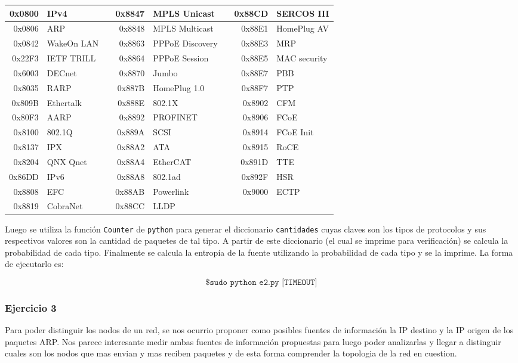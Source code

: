 \begin{tabular}{|r|l|c|r|l|c|r|l|}
\hline
0x0800 & IPv4 & & 0x8847 & MPLS Unicast & & 0x88CD & SERCOS III \\
\hline
0x0806 & ARP & & 0x8848 & MPLS Multicast & & 0x88E1 & HomePlug AV \\
\hline
0x0842 & WakeOn LAN & & 0x8863 & PPPoE Discovery & & 0x88E3 & MRP \\
\hline
0x22F3 & IETF TRILL & & 0x8864 & PPPoE Session & & 0x88E5 & MAC security \\
\hline
0x6003 & DECnet & & 0x8870 & Jumbo & & 0x88E7 & PBB \\
\hline
0x8035 & RARP & & 0x887B & HomePlug 1.0 & & 0x88F7 & PTP \\
\hline
0x809B & Ethertalk & & 0x888E & 802.1X & & 0x8902 & CFM \\
\hline
0x80F3 & AARP & & 0x8892 & PROFINET & & 0x8906 & FCoE \\
\hline
0x8100 & 802.1Q & & 0x889A & SCSI & & 0x8914 & FCoE Init \\
\hline
0x8137 & IPX & & 0x88A2 & ATA & & 0x8915 & RoCE \\
\hline
0x8204 & QNX Qnet & & 0x88A4 & EtherCAT & & 0x891D & TTE  \\
\hline
0x86DD & IPv6 & & 0x88A8 & 802.1ad & & 0x892F & HSR \\
\hline
0x8808 & EFC & & 0x88AB & Powerlink & & 0x9000 & ECTP \\
\hline
0x8819 & CobraNet & & 0x88CC & LLDP & & & \\
\hline
\end{tabular}

Luego se utiliza la función \texttt{Counter} de \texttt{python} para generar el diccionario \texttt{cantidades}
cuyas claves son los tipos de protocolos y sus respectivos valores son la cantidad de paquetes de tal tipo.
A partir de este diccionario (el cual se imprime para verificación) se calcula la probabilidad de cada tipo.
Finalmente se calcula la entropía de la fuente utilizando la probabilidad de cada tipo y se la imprime. La
forma de ejecutarlo es:

\[
\texttt{\$ sudo python e2.py [TIMEOUT]}
\]

\subsubsection{Ejercicio 3}
Para poder distinguir los nodos de un red, se nos ocurrio proponer como posibles fuentes de información la IP destino y la IP origen de los paquetes ARP. Nos parece interesante medir ambas fuentes de información propuestas para luego poder analizarlas y llegar a distinguir cuales son los nodos que mas envian y mas reciben paquetes y de esta forma comprender la topologia de la red en cuestion.

